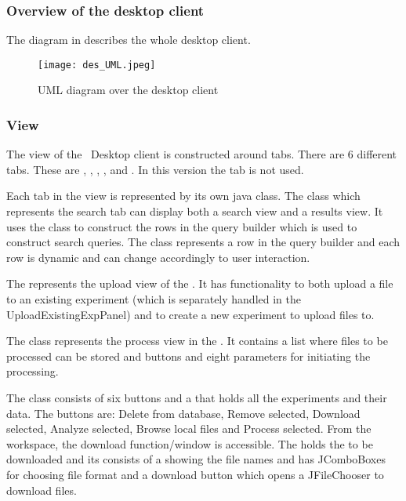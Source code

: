 \subsubsection{Overview of the desktop client}
The  diagram in  describes the whole desktop client.
\begin{figure}[htb!]
	\texttt{[image: des\_UML.jpeg]}
	\caption{UML diagram over the desktop client}
	\label{fig:des_uml-overview}
\end{figure}

\subsubsection{View}
The view of the \appName\ Desktop client is constructed around tabs. There are 6 different tabs. These are , , , ,  and . In this version the  tab is not used.

Each tab in the view is represented by its own java class. The  class which represents the search tab can display both a search view and a results view. It uses the  class to construct the rows in the query builder which is used to construct search queries. The  class represents a row in the query builder and each row is dynamic and can change accordingly to user interaction.

The  represents the upload view of the . It has functionality to both upload a file to an existing experiment (which is separately handled in the UploadExistingExpPanel) and to create a new experiment to upload files to.

The  class represents the process view in the . It contains a list where files to be processed can be stored and buttons and eight parameters for initiating the processing.

The  class consists of six buttons and a  that holds all the experiments and their data. The buttons are: Delete from database, Remove selected, Download selected, Analyze selected, Browse local files and Process selected. From the workspace, the download function/window is accessible. The  holds the  to be downloaded and its  consists of a  showing the file names and has JComboBoxes for choosing file format and a download button which opens a JFileChooser to download files.

